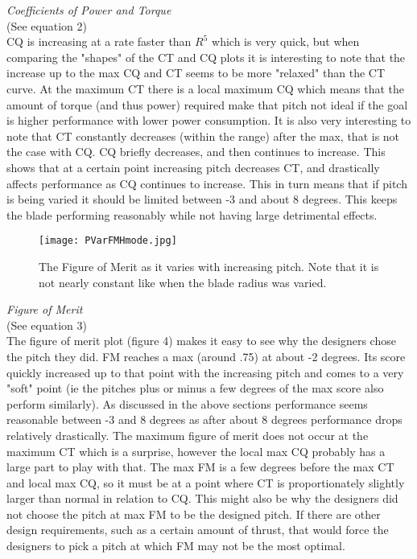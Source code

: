 \documentclass[12pt]{texmemo} %
\begin{document}
\vspace{5mm} %

\textit{Coefficients of Power and Torque}\\ 
(See equation 2)\\
CQ is increasing at a rate faster than $R^5$ which is very quick, but when comparing the "shapes" of the CT and CQ plots it is interesting to note that the increase up  to the max CQ and CT seems to be more "relaxed" than the CT curve. At the maximum CT there is a local maximum CQ which means that the amount of torque (and thus power) required make that pitch not ideal if the goal is higher performance with lower power consumption. It is also very interesting to note that CT constantly decreases (within the range) after the max, that is not the case with CQ. CQ briefly decreases, and then continues to increase. This shows that at a certain point increasing pitch decreases CT, and drastically affects performance as CQ continues to increase. This in turn means that if pitch is being varied it should be limited between -3 and about 8 degrees. This keeps the blade performing reasonably while not having large detrimental effects.

\vspace{5mm} %

\begin{figure}[h]
\centering
\texttt{[image: PVarFMHmode.jpg]}
\caption{The Figure of Merit as it varies with increasing pitch. Note that it is not nearly constant like when the blade radius was varied.}
\end{figure}
\vspace{5mm} %

\textit{Figure of Merit} \\
(See equation 3)\\
The figure of merit plot (figure 4) makes it easy to see why the designers chose the pitch they did. FM reaches a max (around .75) at about -2 degrees. Its score quickly increased up to that point with the increasing pitch and comes to a very "soft" point (ie the pitches plus or minus a few degrees of the max score also perform similarly). As discussed in the above sections performance seems reasonable between -3 and 8 degrees as after about 8 degrees performance drops relatively drastically. The maximum figure of merit does not occur at the maximum CT which is a surprise, however the local max CQ probably has a large part to play with that. The max FM is a few degrees before the max CT and local max CQ, so it must be at a point where CT is proportionately slightly larger than normal in relation to CQ. This might also be why the designers did not choose the pitch at max FM to be the designed pitch. If there are other design requirements, such as a certain amount of thrust, that would force the designers to pick a pitch at which FM may not be the most optimal.
\end{document}

